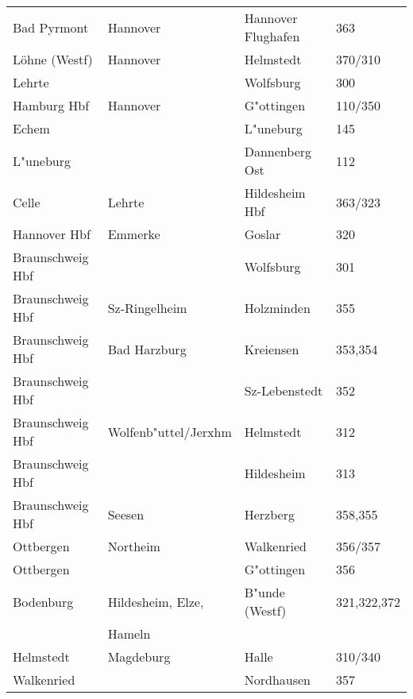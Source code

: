 \begin{table}[h]
\begin{tabular}{l|l|l|l}
	Bad Pyrmont      & Hannover             & Hannover Flughafen & 363\\
	Löhne (Westf)    & Hannover             & Helmstedt          & 370/310\\
	Lehrte           &                      & Wolfsburg          & 300\\
	Hamburg Hbf      & Hannover             & G"ottingen         & 110/350\\
	Echem            &                      & L"uneburg          & 145\\
	L"uneburg        &                      & Dannenberg Ost     & 112\\
	Celle            & Lehrte               & Hildesheim Hbf     & 363/323\\
	Hannover Hbf     & Emmerke              & Goslar             & 320\\
	Braunschweig Hbf &                      & Wolfsburg          & 301\\
	Braunschweig Hbf & Sz-Ringelheim        & Holzminden         & 355\\
	Braunschweig Hbf & Bad Harzburg         & Kreiensen          & 353,354\\
	Braunschweig Hbf &                      & Sz-Lebenstedt      & 352\\
	Braunschweig Hbf & Wolfenb"uttel/Jerxhm & Helmstedt          & 312\\
	Braunschweig Hbf &                      & Hildesheim         & 313\\
	Braunschweig Hbf & Seesen               & Herzberg           & 358,355\\
	Ottbergen        & Northeim             & Walkenried         & 356/357\\
	Ottbergen        &                      & G"ottingen         & 356\\
	Bodenburg        & Hildesheim, Elze,    & B"unde (Westf)     & 321,322,372\\
	                 & Hameln               &                    & \\
	Helmstedt        & Magdeburg            & Halle              & 310/340\\
	Walkenried       &                      & Nordhausen         & 357\\
\end{tabular}
\end{table}

\clearpage
